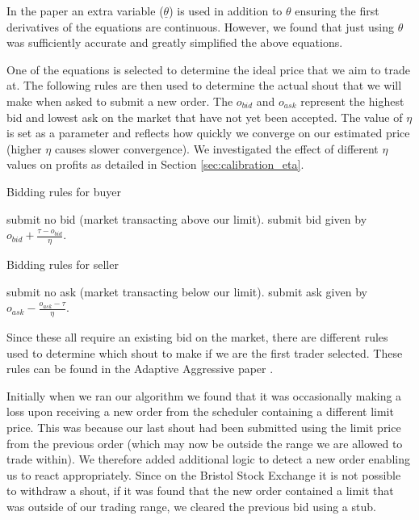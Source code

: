 \documentclass[preprint]{acm_proc_article-sp} %
\begin{document}
In the paper \cite{AA_thesis} an extra variable ($\underline \theta$) is used in addition to $\theta$ 
ensuring the first derivatives of the equations are continuous. However, we found that just using 
$\theta$ was sufficiently accurate and greatly simplified the above equations.

One of the equations is selected to determine the ideal price that we aim to
trade at. The following rules are then used to determine the actual shout
that we will make when asked to submit a new order. The $o_{bid}$ and $o_{ask}$
represent the highest bid and lowest ask on the market that have
not yet been accepted. The value of $\eta$ is set as a parameter and reflects
how quickly we converge on our estimated price (higher $\eta$ causes slower convergence). We investigated the effect of different $\eta$ values on profits as detailed in Section \ref{sec:calibration_eta}.

\begin{algorithm}[H]
    \caption{Bidding rules for buyer}
    \begin{algorithmic}
            \STATE submit no bid (market transacting above our limit).
        \ELSE
            \STATE submit bid given by $\textstyle o_{bid} + \frac{\textstyle \tau - o_{bid}}{\textstyle \eta}$.
        \ENDIF
    \end{algorithmic}
    \label{alg:bidding_rules_buyer}
\end{algorithm}

\begin{algorithm}[H]
    \caption{Bidding rules for seller}
    \begin{algorithmic}
            \STATE submit no ask (market transacting below our limit).
        \ELSE
            \STATE submit ask given by $\textstyle o_{ask} - \frac{\textstyle o_{ask}-\tau}{\textstyle \eta}$.
        \ENDIF
    \end{algorithmic}
    \label{alg:bidding_rules_seller}
\end{algorithm}

Since these all require an existing bid on the market, there are different
rules used to determine which shout to make if we are the first
trader selected. These rules can be found in the Adaptive Aggressive
paper \cite[p.~32]{AA_paper}.

Initially when we ran our algorithm we found that it was occasionally making a
loss upon receiving a new order from the scheduler containing a different limit
price. This was because our last shout had been submitted using
the limit price from the previous order (which may now be outside the range
we are allowed to trade within). We therefore added additional logic to detect a new order enabling 
us to react appropriately. Since on the Bristol Stock Exchange it is not possible to withdraw a shout, 
if it was found that the new order contained a limit that was outside of our trading range, we 
cleared the previous bid using a stub.\\
\end{document}
